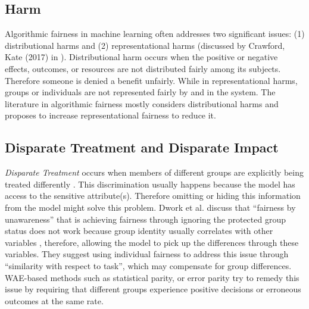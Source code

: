      
    \subsection{Harm}
        Algorithmic fairness in machine learning often addresses two significant issues: (1) distributional harms and (2) representational harms (discussed by Crawford, Kate (2017) in \cite{crawford2017trouble}). Distributional harm occurs when the positive or negative effects, outcomes, or resources are not distributed fairly among its subjects. Therefore someone is denied a benefit unfairly. While in representational harms, groups or individuals are not represented fairly by and in the system. The literature in algorithmic fairness mostly considers distributional harms and proposes to increase representational fairness to reduce it.
    
    \subsection{Disparate Treatment and Disparate Impact}
        
        \textit{Disparate Treatment} occurs when members of different groups are explicitly being treated differently \cite{barocas2016big}. This discrimination usually happens because the model has access to the sensitive attribute(s). Therefore omitting or hiding this information from the model might solve this problem.
        Dwork et al. \cite{Dwork2012individual} discuss that ``fairness by unawareness'' that is achieving fairness through ignoring the protected group status does not work because group identity usually correlates with other variables \cite{Feldman2015}, therefore, allowing the model to pick up the differences through these variables. They suggest using individual fairness to address this issue through ``similarity with respect to task'', which may compensate for group differences. WAE-based methods such as statistical parity, or error parity try to remedy this issue by requiring that different groups experience positive decisions or erroneous outcomes at the same rate.
        

